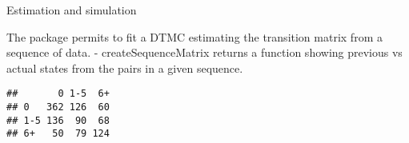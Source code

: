 \documentclass[ignorenonframetext,]{beamer}
\newenvironment{Shaded}{\begin{snugshade}}{\end{snugshade}}
\newcommand{\CommentTok}[1]{\textcolor[rgb]{0.56,0.35,0.01}{\textit{#1}}}
\newcommand{\KeywordTok}[1]{\textcolor[rgb]{0.13,0.29,0.53}{\textbf{#1}}}
\newcommand{\NormalTok}[1]{#1}
\newcommand{\OperatorTok}[1]{\textcolor[rgb]{0.81,0.36,0.00}{\textbf{#1}}}
\begin{document}
\begin{frame}{Estimation and simulation}
\protect\hypertarget{estimation-and-simulation}{}

The package permits to fit a DTMC estimating the transition matrix from
a sequence of data. - createSequenceMatrix returns a function showing
previous vs actual states from the pairs in a given sequence.

\end{frame}

\begin{frame}[fragile]

\begin{Shaded}
\end{Shaded}

\begin{verbatim}
##       0 1-5  6+
## 0   362 126  60
## 1-5 136  90  68
## 6+   50  79 124
\end{verbatim}

\end{frame}
\end{document}
